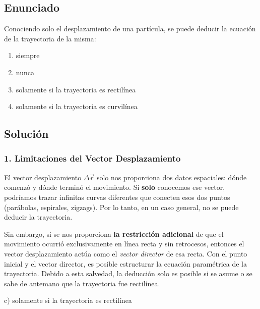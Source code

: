 \documentclass[12pt, a4paper]{article}
\begin{document}

\subsection*{Enunciado}
Conociendo solo el desplazamiento de una partícula, se puede deducir la ecuación de la trayectoria de la misma:
\begin{enumerate}[label=\alph*)]
    \item siempre
    \item nunca
    \item solamente si la trayectoria es rectilínea
    \item solamente si la trayectoria es curvilínea
\end{enumerate}

\subsection*{Solución}

\subsubsection*{1. Limitaciones del Vector Desplazamiento}
El vector desplazamiento $\Delta \vec{r}$ solo nos proporciona dos datos espaciales: dónde comenzó y dónde terminó el movimiento. 
Si \textbf{solo} conocemos ese vector, podríamos trazar infinitas curvas diferentes que conecten esos dos puntos (parábolas, espirales, zigzags). Por lo tanto, en un caso general, no se puede deducir la trayectoria.

Sin embargo, si se nos proporciona \textbf{la restricción adicional} de que el movimiento ocurrió exclusivamente en línea recta y sin retrocesos, entonces el vector desplazamiento actúa como el \textit{vector director} de esa recta. Con el punto inicial y el vector director, es posible estructurar la ecuación paramétrica de la trayectoria. 
Debido a esta salvedad, la deducción solo es posible si se asume o se sabe de antemano que la trayectoria fue rectilínea.

\begin{tcolorbox}[colback=green!5!white, colframe=green!50!black, title=Respuesta Final]
\centering \Large c) solamente si la trayectoria es rectilínea
\end{tcolorbox}

\newpage
\end{document}
